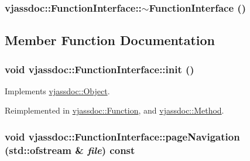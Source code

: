 \hypertarget{classvjassdoc_1_1FunctionInterface_35cab1ce58b14423de2f6c183f1ba9d8}{
\subsubsection{\setlength{\rightskip}{0pt plus 5cm}vjassdoc::FunctionInterface::$\sim$FunctionInterface ()}}
\label{classvjassdoc_1_1FunctionInterface_35cab1ce58b14423de2f6c183f1ba9d8}




\subsection{Member Function Documentation}
\hypertarget{classvjassdoc_1_1FunctionInterface_3b988163d8012beac222b27f80484242}{
\subsubsection{\setlength{\rightskip}{0pt plus 5cm}void vjassdoc::FunctionInterface::init ()}}
\label{classvjassdoc_1_1FunctionInterface_3b988163d8012beac222b27f80484242}




Implements \hyperlink{classvjassdoc_1_1Object_bd43e77dbe80055f5adda67661dfaca4}{vjassdoc::Object}.

Reimplemented in \hyperlink{classvjassdoc_1_1Function_031d74f7df7c29afb36626fd335b2037}{vjassdoc::Function}, and \hyperlink{classvjassdoc_1_1Method_cd115b1b9a459752e6613925be8e9daf}{vjassdoc::Method}.\hypertarget{classvjassdoc_1_1FunctionInterface_90bd64ed95596db63699df15aa35216e}{
\subsubsection{\setlength{\rightskip}{0pt plus 5cm}void vjassdoc::FunctionInterface::pageNavigation (std::ofstream \& {\em file}) const}}
\label{classvjassdoc_1_1FunctionInterface_90bd64ed95596db63699df15aa35216e}




